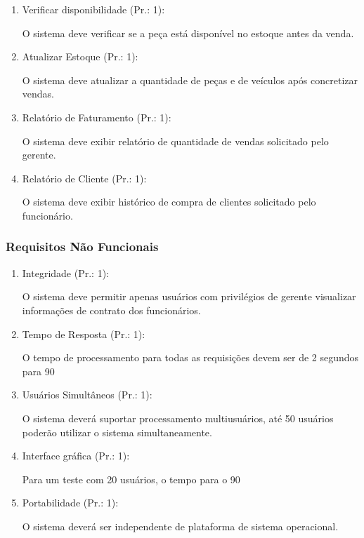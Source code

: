 \begin{enumerate}[
	label=RF\arabic{*}, 
	ref=(RF\arabic{*}),
	leftmargin=1.5em,
	itemindent=4.5em]
\item Verificar disponibilidade (Pr.: 1):\par
O sistema deve verificar se a peça está disponível no estoque antes da venda.\par

\item Atualizar Estoque (Pr.: 1):\par
O sistema deve atualizar a quantidade de peças e de veículos após concretizar vendas.\par

\item Relatório de Faturamento (Pr.: 1):\par
O sistema deve exibir relatório de quantidade de vendas solicitado pelo gerente.\par

\item Relatório de Cliente (Pr.: 1):\par
O sistema deve exibir histórico de compra de clientes solicitado pelo funcionário. \par


\end{enumerate}

\subsubsection{Requisitos Não Funcionais}



\begin{enumerate}[
	label=RNF\arabic{*}, 
	ref=(RNF\arabic{*}),
	leftmargin=1.5em,
	itemindent=4.5em]
	
	\item Integridade (Pr.: 1):\par
	O sistema deve permitir apenas usuários com privilégios de gerente visualizar informações de contrato dos funcionários.\par
	
	\item Tempo de Resposta (Pr.: 1):\par
	O tempo de processamento para todas as requisições devem ser de 2 segundos para  90%
	
	\item Usuários Simultâneos (Pr.: 1):\par
	O sistema deverá suportar processamento multiusuários, até 50 usuários poderão utilizar o sistema simultaneamente. \par
	
	\item Interface gráfica (Pr.: 1):\par
	Para um teste com 20 usuários, o tempo para o 90%
	
	\item Portabilidade (Pr.: 1):\par
	O sistema deverá ser independente de plataforma de sistema operacional. \par
\end{enumerate}
